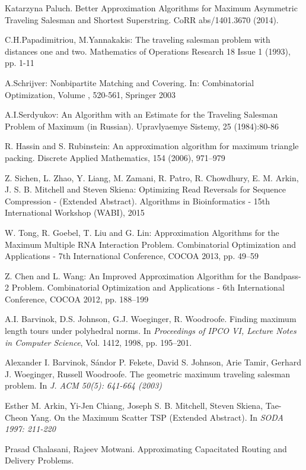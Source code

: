 \documentclass[a4, 11pt]{article}
\newcommand{\<}{\langle}
\renewcommand{\>}{\rangle}
\begin{document}
\begin{thebibliography}{99}
Katarzyna Paluch.
\newblock Better Approximation Algorithms for Maximum Asymmetric Traveling Salesman and Shortest Superstring.
\newblock  CoRR abs/1401.3670 (2014).

 C.H.Papadimitriou, M.Yannakakis:
The traveling salesman problem with distances one and two.
Mathematics of Operations Research 18 Issue 1 (1993), pp. 1-11

 A.Schrijver: Nonbipartite Matching and Covering. In:
Combinatorial Optimization, Volume , 520-561, Springer 2003

 A.I.Serdyukov:  An Algorithm with an Estimate for the Traveling Salesman Problem of Maximum (in Russian).
Upravlyaemye Sistemy, 25 (1984):80-86

 R. Hassin and S. Rubinstein: An approximation algorithm for maximum triangle packing.
Discrete Applied Mathematics, 154 (2006), 971--979

 Z. Sichen, L. Zhao, Y. Liang, M. Zamani, R. Patro, R. Chowdhury, E. M. Arkin, J. S. B. Mitchell and Steven Skiena: Optimizing Read Reversals for Sequence Compression - (Extended Abstract).
Algorithms in Bioinformatics - 15th International Workshop ({WABI}), 2015


 W. Tong, R. Goebel, T. Liu and G. Lin: Approximation Algorithms for the Maximum Multiple {RNA} Interaction Problem.
Combinatorial Optimization and Applications - 7th International Conference, {COCOA} 2013, pp. 49--59

 Z. Chen and L. Wang: An Improved Approximation Algorithm for the Bandpass-2 Problem.
Combinatorial Optimization and Applications - 6th International Conference, {COCOA} 2012, pp. 188--199

A.I. Barvinok, D.S. Johnson, G.J. Woeginger, R. Woodroofe.
\newblock Finding maximum length tours under polyhedral norms.
\newblock In {\em Proceedings of IPCO VI, Lecture Notes in Computer Science},
Vol. 1412, 1998, pp. 195–201.

Alexander I. Barvinok, Sándor P. Fekete, David S. Johnson, Arie Tamir, Gerhard J. Woeginger, Russell Woodroofe.
\newblock The geometric maximum traveling salesman problem. 
\newblock In {\em J. ACM 50(5): 641-664 (2003)}

Esther M. Arkin, Yi-Jen Chiang, Joseph S. B. Mitchell, Steven Skiena, Tae-Cheon Yang.
\newblock On the Maximum Scatter TSP (Extended Abstract). 
\newblock In {\em SODA 1997: 211-220}

Prasad Chalasani, Rajeev Motwani.
\newblock Approximating Capacitated Routing and Delivery Problems. 


\end{thebibliography}
\end{document}
